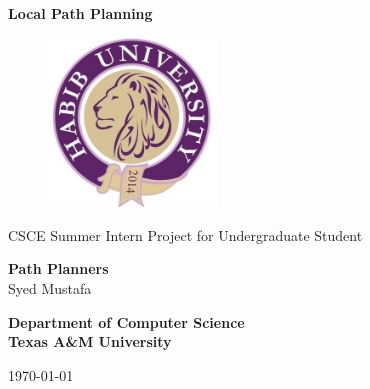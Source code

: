 \begin{titlepage}
    \begin{center}
            
        \Huge
        \textbf{Local Path Planning}
        
        
        \vspace{0.5cm}
        \begin{figure}[H]
            \centering
             \includegraphics[width=0.4\textwidth]{university}
        \end{figure}
       
        
        \vspace{0.5cm}
        \LARGE
        CSCE Summer Intern Project for Undergraduate Student

        \vspace{1.5cm}
        \textbf{Path Planners}\\
        \Large
        Syed Mustafa
        \LARGE
        \\
        
        
        \vspace{1.5cm}
            
        \textbf{Department of Computer Science
                \\
                Texas A\&M University
                }
                \vspace{1cm}
                
                \today
                
            
        \vfill
            
        \vspace{0.8cm}
            
        
            
        \Large

            
    \end{center}
\end{titlepage}